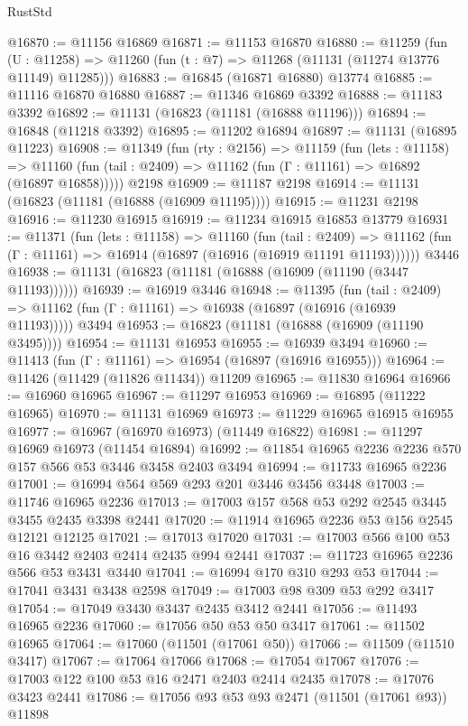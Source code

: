 \begin{lexlean}{RustStd}
\begin{coremodule}
@16870 := @11156 @16869
@16871 := @11153 @16870
@16880 := @11259
    (fun (U : @11258) => @11260 (fun (t : @7) => @11268 (@11131 (@11274 @13776 @11149) @11285)))
@16883 := @16845 (@16871 @16880) @13774
@16885 := @11116 @16870 @16880
@16887 := @11346 @16869 @3392
@16888 := @11183 @3392
@16892 := @11131 (@16823 (@11181 (@16888 @11196)))
@16894 := @16848 (@11218 @3392)
@16895 := @11202 @16894
@16897 := @11131 (@16895 @11223)
@16908 := @11349
    (fun (rty : @2156) =>
    @11159
      (fun (lets : @11158) =>
      @11160 (fun (tail : @2409) => @11162 (fun (Γ : @11161) => @16892 (@16897 @16858)))))
    @2198
@16909 := @11187 @2198
@16914 := @11131 (@16823 (@11181 (@16888 (@16909 @11195))))
@16915 := @11231 @2198
@16916 := @11230 @16915
@16919 := @11234 @16915 @16853 @13779
@16931 := @11371
    (fun (lets : @11158) =>
    @11160
      (fun (tail : @2409) =>
      @11162 (fun (Γ : @11161) => @16914 (@16897 (@16916 (@16919 @11191 @11193))))))
    @3446
@16938 := @11131 (@16823 (@11181 (@16888 (@16909 (@11190 (@3447 @11193))))))
@16939 := @16919 @3446
@16948 := @11395
    (fun (tail : @2409) => @11162 (fun (Γ : @11161) => @16938 (@16897 (@16916 (@16939 @11193)))))
    @3494
@16953 := @16823 (@11181 (@16888 (@16909 (@11190 @3495))))
@16954 := @11131 @16953
@16955 := @16939 @3494
@16960 := @11413 (fun (Γ : @11161) => @16954 (@16897 (@16916 @16955)))
@16964 := @11426 (@11429 (@11826 @11434)) @11209
@16965 := @11830 @16964
@16966 := @16960 @16965
@16967 := @11297 @16953
@16969 := @16895 (@11222 @16965)
@16970 := @11131 @16969
@16973 := @11229 @16965 @16915 @16955
@16977 := @16967 (@16970 @16973) (@11449 @16822)
@16981 := @11297 @16969 @16973 (@11454 @16894)
@16992 := @11854 @16965 @2236 @2236 @570 @157 @566 @53 @3446 @3458 @2403 @3494
@16994 := @11733 @16965 @2236
@17001 := @16994 @564 @569 @293 @201 @3446 @3456 @3448
@17003 := @11746 @16965 @2236
@17013 := @17003 @157 @568 @53 @292 @2545 @3445 @3455 @2435 @3398 @2441
@17020 := @11914 @16965 @2236 @53 @156 @2545 @12121 @12125
@17021 := @17013 @17020
@17031 := @17003 @566 @100 @53 @16 @3442 @2403 @2414 @2435 @994 @2441
@17037 := @11723 @16965 @2236 @566 @53 @3431 @3440
@17041 := @16994 @170 @310 @293 @53
@17044 := @17041 @3431 @3438 @2598
@17049 := @17003 @98 @309 @53 @292 @3417
@17054 := @17049 @3430 @3437 @2435 @3412 @2441
@17056 := @11493 @16965 @2236
@17060 := @17056 @50 @53 @50 @3417
@17061 := @11502 @16965
@17064 := @17060 (@11501 (@17061 @50))
@17066 := @11509 (@11510 @3417)
@17067 := @17064 @17066
@17068 := @17054 @17067
@17076 := @17003 @122 @100 @53 @16 @2471 @2403 @2414 @2435
@17078 := @17076 @3423 @2441
@17086 := @17056 @93 @53 @93 @2471 (@11501 (@17061 @93)) @11898

\end{coremodule}
\end{lexlean}
